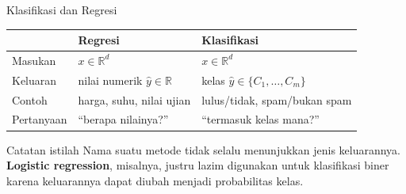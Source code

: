 \documentclass[aspectratio=169,11pt]{beamer}
\begin{document}
\begin{frame}{Klasifikasi dan Regresi}
\small
\begin{center}
\begin{tabular}{p{3.1cm} p{5.1cm} p{5.1cm}}
\toprule
 & Regresi & Klasifikasi \\
\midrule
Masukan & $x\in\mathbb{R}^d$ & $x\in\mathbb{R}^d$ \\
Keluaran & nilai numerik $\hat y\in\mathbb{R}$ & kelas $\hat y\in\{C_1,\ldots,C_m\}$ \\
Contoh & harga, suhu, nilai ujian & lulus/tidak, spam/bukan spam \\
Pertanyaan & ``berapa nilainya?'' & ``termasuk kelas mana?'' \\
\bottomrule
\end{tabular}
\end{center}
\vspace{2mm}
\begin{block}{Catatan istilah}
\small
Nama suatu metode tidak selalu menunjukkan jenis keluarannya. \textbf{Logistic regression}, misalnya, justru lazim digunakan untuk klasifikasi biner karena keluarannya dapat diubah menjadi probabilitas kelas.
\end{block}
\end{frame}
\end{document}
